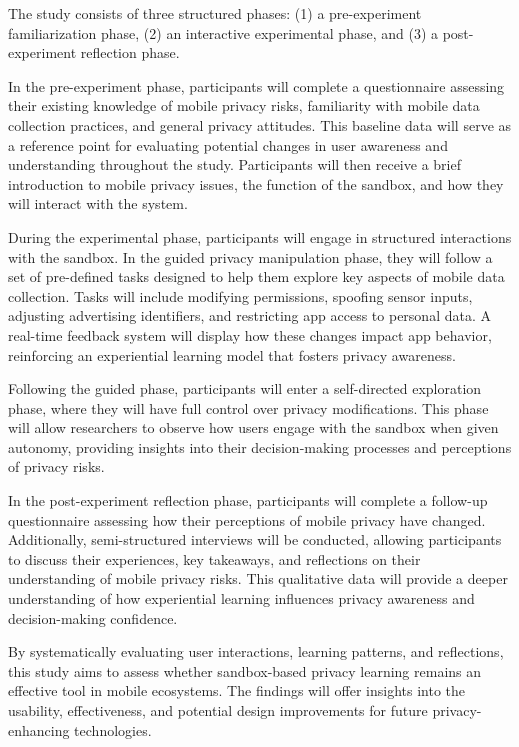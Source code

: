 \documentclass[acmlarge, nonacm]{acmart}
\begin{document}
The study consists of three structured phases: (1) a pre-experiment familiarization phase, (2) an interactive experimental phase, and (3) a post-experiment reflection phase.

In the pre-experiment phase, participants will complete a questionnaire assessing their existing knowledge of mobile privacy risks, familiarity with mobile data collection practices, and general privacy attitudes. This baseline data will serve as a reference point for evaluating potential changes in user awareness and understanding throughout the study. Participants will then receive a brief introduction to mobile privacy issues, the function of the sandbox, and how they will interact with the system.

During the experimental phase, participants will engage in structured interactions with the sandbox. In the guided privacy manipulation phase, they will follow a set of pre-defined tasks designed to help them explore key aspects of mobile data collection. Tasks will include modifying permissions, spoofing sensor inputs, adjusting advertising identifiers, and restricting app access to personal data. A real-time feedback system will display how these changes impact app behavior, reinforcing an experiential learning model that fosters privacy awareness.

Following the guided phase, participants will enter a self-directed exploration phase, where they will have full control over privacy modifications. This phase will allow researchers to observe how users engage with the sandbox when given autonomy, providing insights into their decision-making processes and perceptions of privacy risks.

In the post-experiment reflection phase, participants will complete a follow-up questionnaire assessing how their perceptions of mobile privacy have changed. Additionally, semi-structured interviews will be conducted, allowing participants to discuss their experiences, key takeaways, and reflections on their understanding of mobile privacy risks. This qualitative data will provide a deeper understanding of how experiential learning influences privacy awareness and decision-making confidence.

By systematically evaluating user interactions, learning patterns, and reflections, this study aims to assess whether sandbox-based privacy learning remains an effective tool in mobile ecosystems. The findings will offer insights into the usability, effectiveness, and potential design improvements for future privacy-enhancing technologies.
\end{document}
